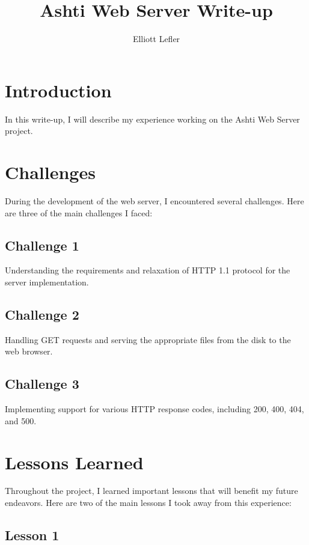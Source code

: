 \documentclass{article}
\title{Ashti Web Server Write-up}
\author{Elliott Lefler}
\begin{document}
\maketitle

\section{Introduction}

In this write-up, I will describe my experience working on the Ashti Web Server project.

\section*{Challenges}

During the development of the web server, I encountered several challenges. Here are three of the main challenges I faced:

\subsection*{Challenge 1}

Understanding the requirements and relaxation of HTTP 1.1 protocol for the server implementation.

\subsection*{Challenge 2}

Handling GET requests and serving the appropriate files from the disk to the web browser.

\subsection*{Challenge 3}

Implementing support for various HTTP response codes, including 200, 400, 404, and 500.

\section*{Lessons Learned}

Throughout the project, I learned important lessons that will benefit my future endeavors. Here are two of the main lessons I took away from this experience:

\subsection*{Lesson 1}
\end{document}
